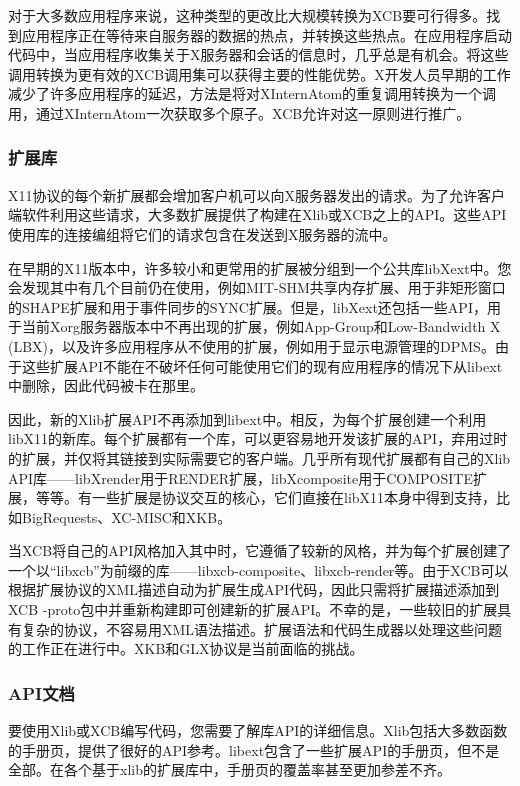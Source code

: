 对于大多数应用程序来说，这种类型的更改比大规模转换为XCB要可行得多。找到应用程序正在等待来自服务器的数据的热点，并转换这些热点。在应用程序启动代码中，当应用程序收集关于X服务器和会话的信息时，几乎总是有机会。将这些调用转换为更有效的XCB调用集可以获得主要的性能优势。X开发人员早期的工作减少了许多应用程序的延迟，方法是将对XInternAtom的重复调用转换为一个调用，通过XInternAtom一次获取多个原子。XCB允许对这一原则进行推广。

\subsubsection{扩展库}

X11协议的每个新扩展都会增加客户机可以向X服务器发出的请求。为了允许客户端软件利用这些请求，大多数扩展提供了构建在Xlib或XCB之上的API。这些API使用库的连接编组将它们的请求包含在发送到X服务器的流中。

在早期的X11版本中，许多较小和更常用的扩展被分组到一个公共库libXext中。您会发现其中有几个目前仍在使用，例如MIT-SHM共享内存扩展、用于非矩形窗口的SHAPE扩展和用于事件同步的SYNC扩展。但是，libXext还包括一些API，用于当前Xorg服务器版本中不再出现的扩展，例如App-Group和Low-Bandwidth X (LBX)，以及许多应用程序从不使用的扩展，例如用于显示电源管理的DPMS。由于这些扩展API不能在不破坏任何可能使用它们的现有应用程序的情况下从libext中删除，因此代码被卡在那里。

因此，新的Xlib扩展API不再添加到libext中。相反，为每个扩展创建一个利用libX11的新库。每个扩展都有一个库，可以更容易地开发该扩展的API，弃用过时的扩展，并仅将其链接到实际需要它的客户端。几乎所有现代扩展都有自己的Xlib API库——libXrender用于RENDER扩展，libXcomposite用于COMPOSITE扩展，等等。有一些扩展是协议交互的核心，它们直接在libX11本身中得到支持，比如BigRequests、XC-MISC和XKB。

当XCB将自己的API风格加入其中时，它遵循了较新的风格，并为每个扩展创建了一个以“libxcb”为前缀的库——libxcb-composite、libxcb-render等。由于XCB可以根据扩展协议的XML描述自动为扩展生成API代码，因此只需将扩展描述添加到XCB -proto包中并重新构建即可创建新的扩展API。不幸的是，一些较旧的扩展具有复杂的协议，不容易用XML语法描述。扩展语法和代码生成器以处理这些问题的工作正在进行中。XKB和GLX协议是当前面临的挑战。

\subsubsection{API文档}

要使用Xlib或XCB编写代码，您需要了解库API的详细信息。Xlib包括大多数函数的手册页，提供了很好的API参考。libext包含了一些扩展API的手册页，但不是全部。在各个基于xlib的扩展库中，手册页的覆盖率甚至更加参差不齐。

